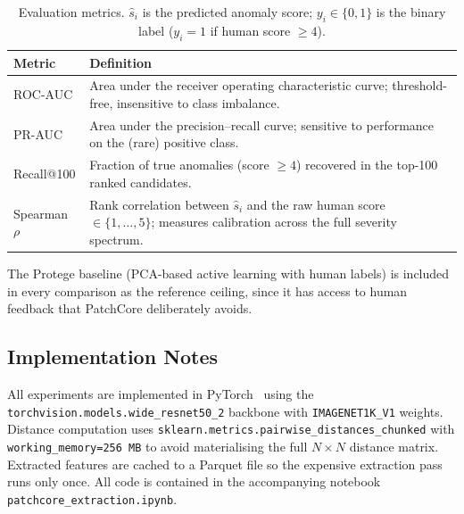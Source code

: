 \begin{table}[H]
\centering
\caption{Evaluation metrics.  $\hat{s}_i$ is the predicted anomaly
  score; $y_i \in \{0,1\}$ is the binary label ($y_i=1$ if human
  score $\geq 4$).}
\label{tab:metrics}
\smallskip
\begin{tabular}{lp{7.5cm}}
\toprule
\textbf{Metric} & \textbf{Definition} \\
\midrule
ROC-AUC
  & Area under the receiver operating characteristic curve;
    threshold-free, insensitive to class imbalance. \\
PR-AUC
  & Area under the precision--recall curve; sensitive to
    performance on the (rare) positive class. \\
Recall@100
  & Fraction of true anomalies (score $\geq 4$) recovered
    in the top-100 ranked candidates. \\
Spearman $\rho$
  & Rank correlation between $\hat{s}_i$ and the raw human
    score $\in\{1,\ldots,5\}$; measures calibration across
    the full severity spectrum. \\
\bottomrule
\end{tabular}
\end{table}

The Protege baseline (PCA-based active learning with human labels) is
included in every comparison as the reference ceiling, since it has
access to human feedback that PatchCore deliberately avoids.

\subsection{Implementation Notes}
\label{sec:patchcore:impl}

All experiments are implemented in PyTorch~\citep{Paszke2019} using the
\texttt{torchvision.models.wide\_resnet50\_2} backbone with
\texttt{IMAGENET1K\_V1} weights.  Distance computation uses
\texttt{sklearn.metrics.pairwise\_distances\_chunked} with
\texttt{working\_memory=256\,MB} to avoid materialising the full
$N\times N$ distance matrix.  Extracted features are cached to a Parquet
file so the expensive extraction pass runs only once.
All code is contained in the accompanying notebook
\texttt{patchcore\_extraction.ipynb}.


